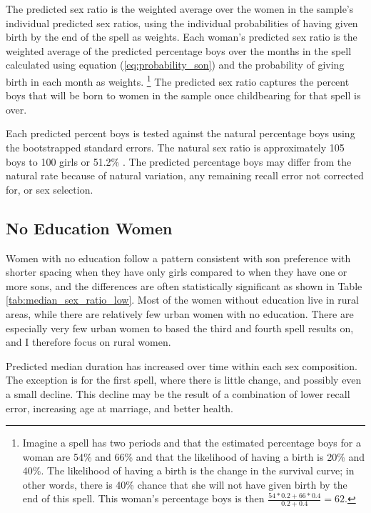 \documentclass[12pt,letterpaper]{article}
\begin{document}
The predicted sex ratio is the weighted average over the women in the sample's 
individual predicted sex ratios, using the individual probabilities of having
given birth by the end of the spell as weights.
Each woman's predicted sex ratio is the weighted average of the predicted
percentage boys over the months in the spell calculated using equation 
(\ref{eq:probability_son}) and the probability of giving birth in each month 
as weights.%
\footnote{
Imagine a spell has two periods and that the estimated percentage boys for a
woman are 54\% and 66\% and that the likelihood of having a birth is 20\% and 40\%.
The likelihood of having a birth is the change in the survival curve; 
in other words, there is 40\% chance that she will not have given birth by the end of 
this spell.
This woman's percentage boys is then $\frac{54*0.2+66*0.4}{0.2+0.4} = 62$.
}
The predicted sex ratio captures the percent boys that will be born to women 
in the sample once childbearing for that spell is over.

Each predicted percent boys is tested against the natural percentage 
boys using the bootstrapped standard errors.
The natural sex ratio is approximately 105 boys to 100 girls or
51.2\% \citep{ben-porath76b,jacobsen99,Portner2015b}.
The predicted percentage boys may differ from the natural rate because of 
natural variation, any remaining recall error not corrected for, or 
sex selection. 

\subsection{No Education Women}



Women with no education follow a pattern consistent with son
preference with shorter spacing when they have only girls compared 
to when they have one or more sons, and the differences are often 
statistically significant as shown in Table \ref{tab:median_sex_ratio_low}.
Most of the women without education live in rural areas,
while there are relatively few urban women with no education.
There are especially very few urban women to based the third
and fourth spell results on, and I therefore focus on rural women.

Predicted median duration has increased over time within
each sex composition.
The exception is for the first spell, where there is little
change, and possibly even a small decline.
This decline may be the result of a combination of lower recall
error, increasing age at marriage, and better health.
\end{document}

